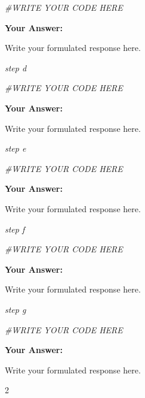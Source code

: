 \documentclass[
]{article}
\newenvironment{Shaded}{\begin{snugshade}}{\end{snugshade}}
\newcommand{\CommentTok}[1]{\textcolor[rgb]{0.56,0.35,0.01}{\textit{#1}}}
\begin{document}
\begin{Shaded}
\begin{Highlighting}[]
\CommentTok{\#WRITE YOUR CODE HERE}
\end{Highlighting}
\end{Shaded}

\textbf{Your Answer:}

Write your formulated response here.

\emph{step d}

\begin{Shaded}
\begin{Highlighting}[]
\CommentTok{\#WRITE YOUR CODE HERE}
\end{Highlighting}
\end{Shaded}

\textbf{Your Answer:}

Write your formulated response here.

\emph{step e}

\begin{Shaded}
\begin{Highlighting}[]
\CommentTok{\#WRITE YOUR CODE HERE}
\end{Highlighting}
\end{Shaded}

\textbf{Your Answer:}

Write your formulated response here.

\emph{step f}

\begin{Shaded}
\begin{Highlighting}[]
\CommentTok{\#WRITE YOUR CODE HERE}
\end{Highlighting}
\end{Shaded}

\textbf{Your Answer:}

Write your formulated response here.

\emph{step g}

\begin{Shaded}
\begin{Highlighting}[]
\CommentTok{\#WRITE YOUR CODE HERE}
\end{Highlighting}
\end{Shaded}

\textbf{Your Answer:}

Write your formulated response here.

2
\end{document}
